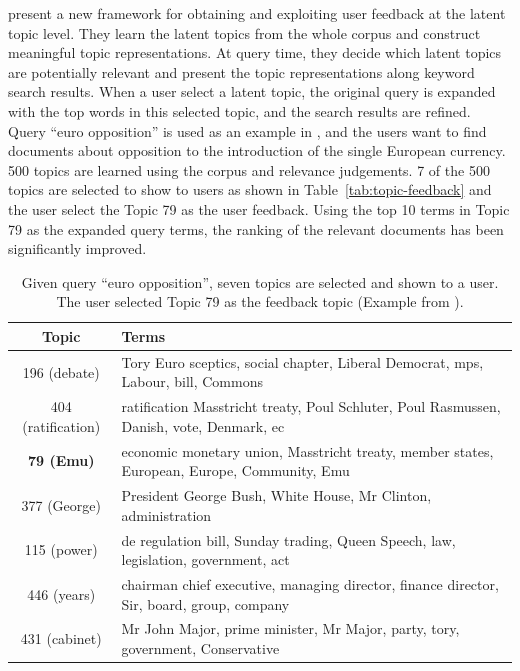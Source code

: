 \citet{Andrzejewski-2011} present a new framework for obtaining and
exploiting user feedback at the latent topic level. They learn the
latent topics from the whole corpus and construct meaningful topic
representations. At query time, they decide which latent topics are
potentially relevant and present the topic representations along
keyword search results. When a user select a latent topic, the
original query is expanded with the top words in this selected topic,
and the search results are refined. 
Query ``euro opposition'' is used as an example in \citet{Andrzejewski-2011},
and the users want to find documents about opposition to the introduction of
the single European currency. 500 topics are learned using the corpus and relevance
judgements. 7 of the 500 topics are selected to show to users as shown in
Table~\ref{tab:topic-feedback} and the user select the Topic 79 as the user feedback.
Using the top 10 terms in Topic 79 as the expanded query terms, the ranking of
the relevant documents has been significantly improved.

\begin{table}[!tp]
\begin{center}
\footnotesize
\setlength\tabcolsep{3pt}
\begin{tabular}{c  p{9cm} } \hline
Topic & Terms \\ \hline \hline
196 (debate) & Tory Euro sceptics, social chapter, Liberal Democrat, mps, Labour, bill, Commons \\
404 (ratification) & ratification Masstricht treaty, Poul Schluter, Poul Rasmussen, Danish, vote, Denmark, ec \\
\textbf{79 (Emu)} & economic monetary union, Masstricht treaty, member states, European, Europe, Community, Emu \\
377 (George) & President George Bush, White House, Mr Clinton, administration \\
115 (power) & de regulation bill, Sunday trading, Queen Speech, law, legislation, government, act \\
446 (years) & chairman chief executive, managing director, finance director, Sir, board, group, company \\
431 (cabinet) & Mr John Major, prime minister, Mr Major, party, tory, government, Conservative \\
\hline
\end{tabular}
\caption{Given query ``euro opposition'', seven topics are selected and shown to a user. The user selected Topic 79
as the feedback topic (Example from \citet{Andrzejewski-2011}).}
\label{tab:reorder-topic}
\end{center}
\end{table}

